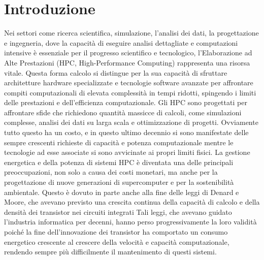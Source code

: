\chapter{Introduzione}
\noindent
Nei settori come ricerca scientifica, simulazione, l'analisi dei dati, la progettazione e ingegneria, dove la capacità di eseguire analisi dettagliate e computazioni intensive è essenziale per il progresso scientifico e tecnologico, l'Elaborazione ad Alte Prestazioni (HPC, High-Performance Computing) rappresenta una risorsa vitale. Questa forma calcolo si distingue per la sua capacità di sfruttare architetture hardware specializzate e tecnologie software avanzate per affrontare compiti computazionali di elevata complessità in tempi ridotti, spingendo i limiti delle prestazioni e dell'efficienza computazionale.%
Gli HPC sono progettati per affrontare sfide che richiedono quantità massicce di calcoli, come simulazioni complesse, analisi dei dati su larga scala e ottimizzazione di progetti. Ovviamente tutto questo ha un costo, e in questo ultimo decennio si sono manifestate delle sempre crescenti richieste di capacità e potenza computazionale mentre le tecnologie ad esse associate si sono avvicinate ai propri limiti fisici. %
La gestione energetica e della potenza di sistemi HPC è diventata una delle principali preoccupazioni, non solo a causa dei costi monetari, ma anche per la progettazione di nuove generazioni %
di supercomputer e per la sostenibilità ambientale. 
Questo è dovuto in parte anche alla fine delle leggi di Denard e Moore, che avevano previsto una crescita continua della capacità di calcolo e della densità dei transistor nei circuiti integrati %
Tali leggi, che avevano guidato l'industria informatica per decenni, hanno perso progressivamente la loro validità poiché la fine dell'innovazione dei transistor %
ha comportato un consumo energetico crescente al crescere della velocità e capacità computazionale, rendendo sempre più difficilmente il mantenimento di questi sistemi. %
